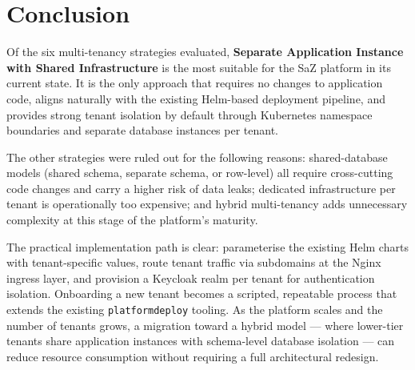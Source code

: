 \chapter{Conclusion}
\label{chapter:conclusion}

Of the six multi-tenancy strategies evaluated, \textbf{Separate Application Instance with Shared Infrastructure} is the most suitable for the SaZ platform in its current state. It is the only approach that requires no changes to application code, aligns naturally with the existing Helm-based deployment pipeline, and provides strong tenant isolation by default through Kubernetes namespace boundaries and separate database instances per tenant.

The other strategies were ruled out for the following reasons: shared-database models (shared schema, separate schema, or row-level) all require cross-cutting code changes and carry a higher risk of data leaks; dedicated infrastructure per tenant is operationally too expensive; and hybrid multi-tenancy adds unnecessary complexity at this stage of the platform's maturity.

The practical implementation path is clear: parameterise the existing Helm charts with tenant-specific values, route tenant traffic via subdomains at the Nginx ingress layer, and provision a Keycloak realm per tenant for authentication isolation. Onboarding a new tenant becomes a scripted, repeatable process that extends the existing \texttt{platformdeploy} tooling. As the platform scales and the number of tenants grows, a migration toward a hybrid model --- where lower-tier tenants share application instances with schema-level database isolation --- can reduce resource consumption without requiring a full architectural redesign.

